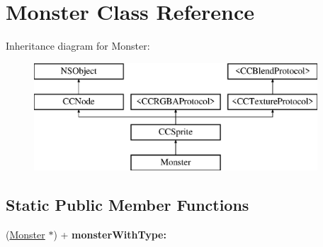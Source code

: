 \hypertarget{interface_monster}{\section{Monster Class Reference}
\label{interface_monster}
}
Inheritance diagram for Monster\-:\begin{figure}[H]
\begin{center}
\leavevmode
\includegraphics[height=4.000000cm]{interface_monster}
\end{center}
\end{figure}
\subsection*{Static Public Member Functions}
\begin{DoxyCompactItemize}
\item 
\hypertarget{interface_monster_a449e68465b27e532c458b5786332e213}{(\hyperlink{interface_monster}{Monster} $\ast$) + {\bfseries monster\-With\-Type\-:}}\label{interface_monster_a449e68465b27e532c458b5786332e213}

\end{DoxyCompactItemize}

